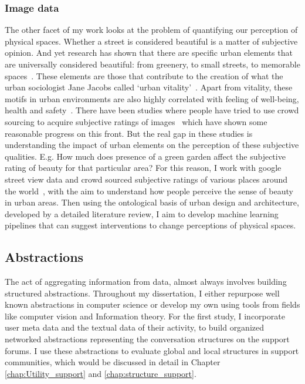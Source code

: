 \subsubsection{Image data}
The other facet of my work looks at the problem of quantifying our perception of physical spaces. Whether a street is considered beautiful is a matter of subjective opinion. And yet research has shown that there are specific urban elements that are universally considered beautiful: from greenery, to small streets, to memorable spaces~\cite{alexander1977pattern, quercia2014aesthetic,salesses2013collaborative}. These elements are those that contribute to the creation of what the urban sociologist Jane Jacobs called `urban vitality'~\cite{jacobs1961death}. Apart from vitality, these motifs in urban environments are also highly correlated with feeling of well-being, health and safety~\cite{kaplan1989experience}. There have been studies where people have tried to use crowd sourcing to acquire subjective ratings of images~\cite{seresinhe2015quantifying} which have shown some reasonable progress on this front. But the real gap in these studies is understanding the impact of urban elements on the perception of these subjective qualities. E.g. How much does presence of a green garden affect the subjective rating of beauty for that particular area? For this reason, I work with google street view data and crowd sourced subjective ratings of various places around the world~\cite{naik2014streetscore}, with the aim to understand how people perceive the sense of beauty in urban areas. Then using the ontological basis of urban design and architecture, developed by a detailed literature review, I aim to develop machine learning pipelines that can suggest interventions to change perceptions of physical spaces.

\subsection{Abstractions}
The act of aggregating information from data, almost always involves building structured abstractions. Throughout my dissertation, I either repurpose well known abstractions in computer science or develop my own using tools from fields like computer vision and Information theory. For the first study, I incorporate user meta data and the textual data of their activity, to build organized networked abstractions representing the conversation structures on the support forums. I use these abstractions to evaluate global and local structures in support communities, which would be discussed in detail in Chapter \ref{chap:Utility_support} and \ref{chap:structure_support}. 
  
